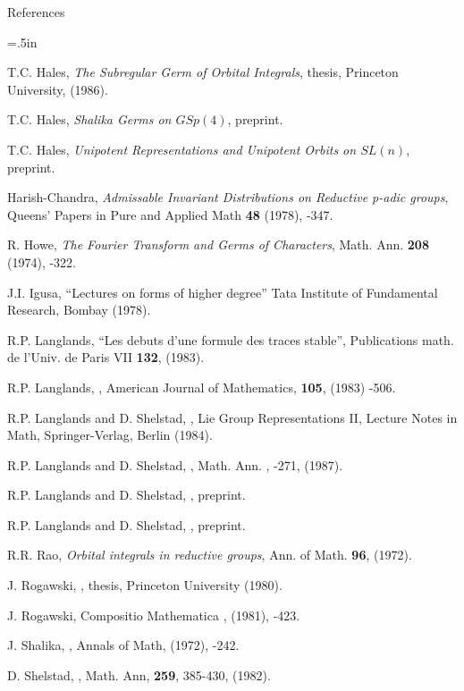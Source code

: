 \sect References \endsect
\bigskip

\everypar={\hangindent .5in}


  T.C. Hales, {\it  The Subregular Germ of Orbital
Integrals},  thesis, Princeton University, (1986). 

 T.C. Hales, {\it Shalika Germs on $GSp(4)$}, 
preprint. 

 T.C. Hales, {\it Unipotent Representations and Unipotent
Orbits on $SL(n)$}, preprint.

 \by Harish-Chandra, {\it Admissable Invariant
Distributions on Reductive p-adic groups\/},  Queens' Papers in
Pure and Applied Math {\bf 48} \yr (1978), -347. \endref

 \by R. Howe, {\it The Fourier Transform and Germs of
Characters\/}, Math. Ann. {\bf 208} \yr (1974), -322. \endref

 \by J.I. Igusa, ``Lectures on forms of higher degree''
Tata Institute of Fundamental Research, Bombay \yr (1978).
\endref

 \by R.P. Langlands, \book ``Les debuts d'une formule des
traces stable'', \publ Publications math. de l'Univ. de Paris VII \vol
{\bf 132}, \yr (1983). \endref

 \by R.P. Langlands, , \jour American Journal of Mathematics, {\bf  105}, (1983)
-506. \endref

 \by R.P. Langlands and D. Shelstad, , \jour Lie Group Representations II,
Lecture Notes in Math,  \publ Springer-Verlag, Berlin \yr
(1984). \endref

 \by R.P. Langlands and D. Shelstad, , \jour Math. Ann. , -271, \yr (1987). \endref

 \by R.P. Langlands and D. Shelstad, , \paperinfo preprint. \endref

 \by R.P. Langlands and D. Shelstad, , \paperinfo preprint. \endref

  \by R.R. Rao, {\it Orbital integrals in reductive groups}, Ann. of Math. {\bf 96},
(1972).

 \by J. Rogawski, , \paperinfo thesis, Princeton University \yr (1980).

 \by J. Rogawski,  \jour Compositio Mathematica , \yr (1981),
-423. \endref

 \by J. Shalika, , \jour Annals of Math,  \yr (1972), -242. \endref

 \by D. Shelstad, , Math. Ann,
{\bf 259}, 385-430, {(1982)}.
\bye
